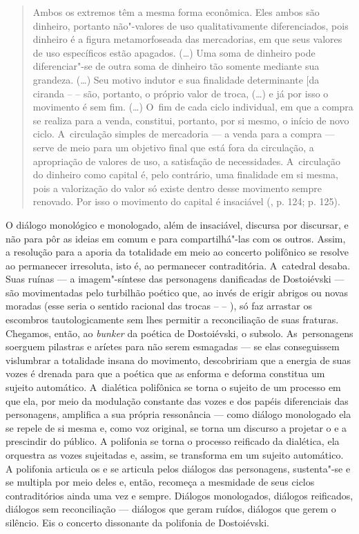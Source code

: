 \begin{quote}
Ambos os extremos têm a mesma forma econômica. Eles ambos são dinheiro,
portanto não"-valores de uso qualitativamente diferenciados, pois
dinheiro é a figura metamorfoseada das mercadorias, em que seus valores
de uso específicos estão apagados. (\ldots) Uma soma de dinheiro pode
diferenciar"-se de outra soma de dinheiro tão somente mediante sua
grandeza. (\ldots) Seu motivo indutor e sua finalidade determinante {[}da
ciranda  --  -- \versal{D}{]} são, portanto, o próprio valor de troca, (\ldots) e
já por isso o movimento é sem fim. (\ldots{}) O~fim de cada ciclo
individual, em que a compra se realiza para a venda, constitui,
portanto, por si mesmo, o início de novo ciclo. A~circulação simples de
mercadoria --- a venda para a compra --- serve de meio para um objetivo
final que está fora da circulação, a apropriação de valores de uso, a
satisfação de necessidades. A~circulação do dinheiro como capital é,
pelo contrário, uma finalidade em si mesma, pois a valorização do valor
só existe dentro desse movimento sempre renovado. Por isso o movimento
do capital é insaciável (, p. 124; p. 125).
\end{quote}

O diálogo monológico e monologado, além de insaciável, discursa por
discursar, e não para pôr as ideias em comum e para compartilhá"-las com
os outros. Assim, a resolução para a aporia da totalidade em meio ao
concerto polifônico se resolve ao permanecer irresoluta, isto é, ao
permanecer contraditória. A~catedral desaba. Suas ruínas --- a
imagem"-síntese das personagens danificadas de Dostoiévski --- são
movimentadas pelo turbilhão poético que, ao invés de erigir abrigos ou
novas moradas (esse seria o sentido racional das trocas  --  -- ), só
faz arrastar os escombros tautologicamente sem lhes permitir a
reconciliação de suas fraturas. Chegamos, então, ao \emph{bunker} da
poética de Dostoiévski, o subsolo. As~personagens soerguem pilastras e
aríetes para não serem esmagadas --- se elas conseguissem vislumbrar a
totalidade insana do movimento, descobririam que a energia de suas vozes
é drenada para que a poética que as enforma e deforma constitua um
sujeito automático. A~dialética polifônica se torna o sujeito de um
processo em que ela, por meio da modulação constante das vozes e dos
papéis diferenciais das personagens, amplifica a sua própria ressonância
--- como diálogo monologado ela se repele de si mesma e, como voz
original, se torna um discurso a projetar o e a prescindir do público. A
polifonia se torna o processo reificado da dialética, ela orquestra as
vozes sujeitadas e, assim, se transforma em um sujeito automático. A
polifonia articula os e se articula pelos diálogos das personagens,
sustenta"-se e se multipla por meio deles e, então, recomeça a mesmidade
de seus ciclos contraditórios ainda uma vez e sempre. Diálogos
monologados, diálogos reificados, diálogos sem reconciliação --- diálogos
que geram ruídos, diálogos que gerem o silêncio. Eis o concerto
dissonante da polifonia de Dostoiévski.

